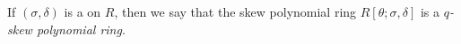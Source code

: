 \documentclass{article}
\begin{document}
If $(\sigma, \delta)$ is a  on $R$, 
then we say that the skew polynomial ring $R[\theta;\sigma,\delta]$ 
is a {\it $q$-skew polynomial ring}.
\end{document}
